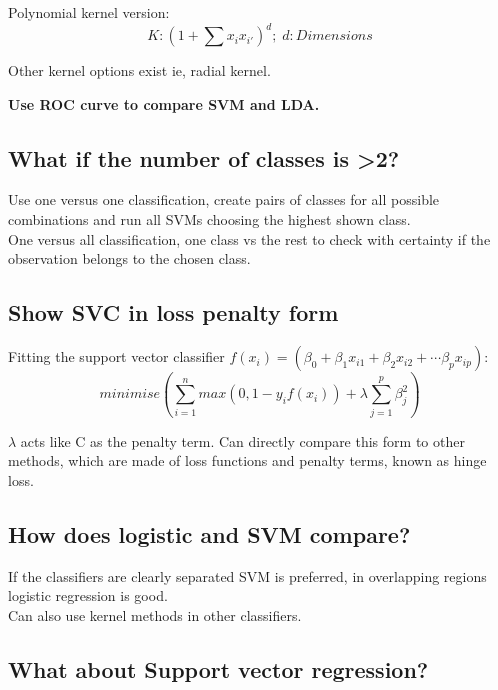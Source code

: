 \documentclass[11pt]{scrartcl} %
\begin{document}
Polynomial kernel version:
\begin{equation}
	K: (1+ \sum{x_ix_{i'}})^d;\; d:Dimensions
\end{equation}

Other kernel options exist ie, radial kernel.

\textbf{Use ROC curve to compare SVM and LDA.}

\subsection{What if the number of classes is >2?}

Use one versus one classification, create pairs of classes for all possible combinations and run
all SVMs choosing the highest shown class.\\

One versus all classification, one class vs the rest to check with certainty if the observation belongs
to the chosen class.

\subsection{Show SVC in loss penalty form}

Fitting the support vector classifier \(f(x_i) = (\beta_0+\beta_1x_{i1}+\beta_2x_{i2}+\cdots \beta_px_{ip})\):
\begin{equation}
	minimise({\sum^n_{i=1}{max(0,1-y_if(x_i))+\lambda\sum^p_{j=1}{\beta^2_j}}})
\end{equation}

\(\lambda\) acts like C as the penalty term. Can directly compare this form to other methods, which are
made of loss functions and penalty terms, known as hinge loss.

\subsection{How does logistic and SVM compare?}

If the classifiers are clearly separated SVM is preferred, in overlapping regions logistic regression is good.\\

Can also use kernel methods in other classifiers.

\subsection{What about Support vector regression?}
\end{document}
